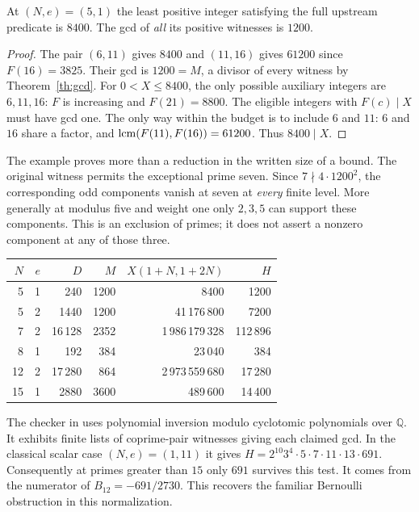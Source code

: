 \begin{theorem}
At $(N,e)=(5,1)$ the least positive integer satisfying the full upstream
predicate is $8400$. The gcd of \emph{all} its positive witnesses is $1200$.
\end{theorem}
\begin{proof}
The pair $(6,11)$ gives $8400$ and $(11,16)$ gives $61200$ since
$F(16)=3825$. Their gcd is $1200=M$, a divisor of every witness by
Theorem~\ref{th:gcd}. For $0<X\le8400$, the only possible auxiliary
integers are $6,11,16$: $F$ is increasing and $F(21)=8800$.
The eligible integers with $F(c)\mid X$ must have gcd one. The only way
within the budget is to include $6$ and $11$: $6$ and $16$ share a
factor, and $\mathop{\rm lcm}(F(11),F(16))=61200$.
Thus $8400\mid X$.
\end{proof}
The example proves more than a reduction in the written size of a bound.
The original witness permits the exceptional prime seven. Since
$7\nmid4\cdot1200^2$, the corresponding odd components vanish at seven at
\emph{every} finite level. More generally at modulus five and weight one
only $2,3,5$ can support these components. This is an exclusion of primes;
it does not assert a nonzero component at any of those three.

\begin{center}
\begin{tabular}{rr r r r r}
\toprule
$N$ & $e$ & $D$ & $M$ & $X(1+N,1+2N)$ & $H$\\
\midrule
5&1&240&1200&8400&1200\\
5&2&1440&1200&41\,176\,800&7200\\
7&2&16\,128&2352&1\,986\,179\,328&112\,896\\
8&1&192&384&23\,040&384\\
12&2&17\,280&864&2\,973\,559\,680&17\,280\\
15&1&2880&3600&489\,600&14\,400\\
\bottomrule
\end{tabular}
\end{center}
The checker in  uses polynomial inversion modulo
cyclotomic polynomials over $\mathbb Q$. It exhibits finite lists of
coprime-pair witnesses giving each claimed gcd. In the classical scalar
case $(N,e)=(1,11)$ it gives
$H=2^{10}3^4\cdot5\cdot7\cdot11\cdot13\cdot691$.
Consequently at primes greater than $15$ only $691$ survives this test.
It comes from the numerator of $B_{12}=-691/2730$.
This recovers the familiar Bernoulli obstruction in this normalization.
